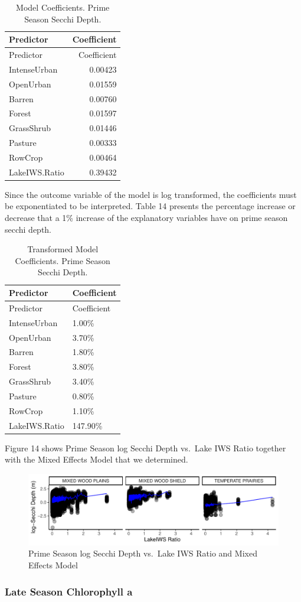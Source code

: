\documentclass[12pt,]{article}
\begin{document}
\newpage

\begin{longtable}[]{@{}lr@{}}
\caption{Model Coefficients. Prime Season Secchi Depth.}\tabularnewline
\toprule
Predictor & Coefficient\tabularnewline
\midrule
\endfirsthead
\toprule
Predictor & Coefficient\tabularnewline
\midrule
\endhead
IntenseUrban & 0.00423\tabularnewline
OpenUrban & 0.01559\tabularnewline
Barren & 0.00760\tabularnewline
Forest & 0.01597\tabularnewline
GrassShrub & 0.01446\tabularnewline
Pasture & 0.00333\tabularnewline
RowCrop & 0.00464\tabularnewline
LakeIWS.Ratio & 0.39432\tabularnewline
\bottomrule
\end{longtable}

Since the outcome variable of the model is log transformed, the
coefficients must be exponentiated to be interpreted. Table 14 presents
the percentage increase or decrease that a 1\% increase of the
explanatory variables have on prime season secchi depth.

\begin{longtable}[]{@{}ll@{}}
\caption{Transformed Model Coefficients. Prime Season Secchi
Depth.}\tabularnewline
\toprule
Predictor & Coefficient\tabularnewline
\midrule
\endfirsthead
\toprule
Predictor & Coefficient\tabularnewline
\midrule
\endhead
IntenseUrban & 1.00\%\tabularnewline
OpenUrban & 3.70\%\tabularnewline
Barren & 1.80\%\tabularnewline
Forest & 3.80\%\tabularnewline
GrassShrub & 3.40\%\tabularnewline
Pasture & 0.80\%\tabularnewline
RowCrop & 1.10\%\tabularnewline
LakeIWS.Ratio & 147.90\%\tabularnewline
\bottomrule
\end{longtable}

Figure 14 shows Prime Season log Secchi Depth vs.~Lake IWS Ratio
together with the Mixed Effects Model that we determined.

\begin{figure}
\centering
\includegraphics{Bollt_Greif_Raby_Roth_Project_Final_files/figure-latex/unnamed-chunk-29-1.pdf}
\caption{Prime Season log Secchi Depth vs.~Lake IWS Ratio and Mixed
Effects Model}
\end{figure}

\hypertarget{late-season-chlorophyll-a}{%
\subsubsection{Late Season Chlorophyll
a}\label{late-season-chlorophyll-a}}
\end{document}
